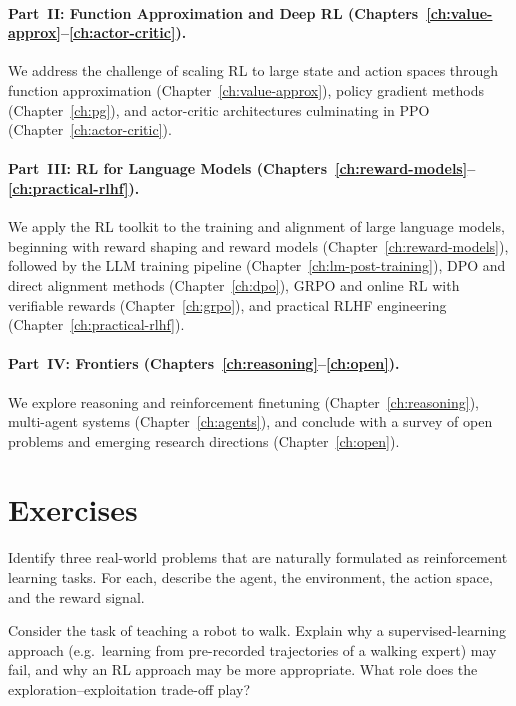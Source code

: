 \paragraph{Part~II: Function Approximation and Deep RL (Chapters~\ref{ch:value-approx}--\ref{ch:actor-critic}).}
We address the challenge of scaling RL to large state and action spaces through function approximation (Chapter~\ref{ch:value-approx}), policy gradient methods (Chapter~\ref{ch:pg}), and actor-critic architectures culminating in PPO (Chapter~\ref{ch:actor-critic}).

\paragraph{Part~III: RL for Language Models (Chapters~\ref{ch:reward-models}--\ref{ch:practical-rlhf}).}
We apply the RL toolkit to the training and alignment of large language models, beginning with reward shaping and reward models (Chapter~\ref{ch:reward-models}), followed by the LLM training pipeline (Chapter~\ref{ch:lm-post-training}), DPO and direct alignment methods (Chapter~\ref{ch:dpo}), GRPO and online RL with verifiable rewards (Chapter~\ref{ch:grpo}), and practical RLHF engineering (Chapter~\ref{ch:practical-rlhf}).

\paragraph{Part~IV: Frontiers (Chapters~\ref{ch:reasoning}--\ref{ch:open}).}
We explore reasoning and reinforcement finetuning (Chapter~\ref{ch:reasoning}), multi-agent systems (Chapter~\ref{ch:agents}), and conclude with a survey of open problems and emerging research directions (Chapter~\ref{ch:open}).


\section*{Exercises}

\begin{exercise}
\label{ex:rl-examples}
Identify three real-world problems that are naturally formulated as reinforcement learning tasks.  For each, describe the agent, the environment, the action space, and the reward signal.
\end{exercise}

\begin{exercise}
\label{ex:sl-vs-rl}
Consider the task of teaching a robot to walk.  Explain why a supervised-learning approach (e.g.\ learning from pre-recorded trajectories of a walking expert) may fail, and why an RL approach may be more appropriate.  What role does the exploration--exploitation trade-off play?
\end{exercise}

